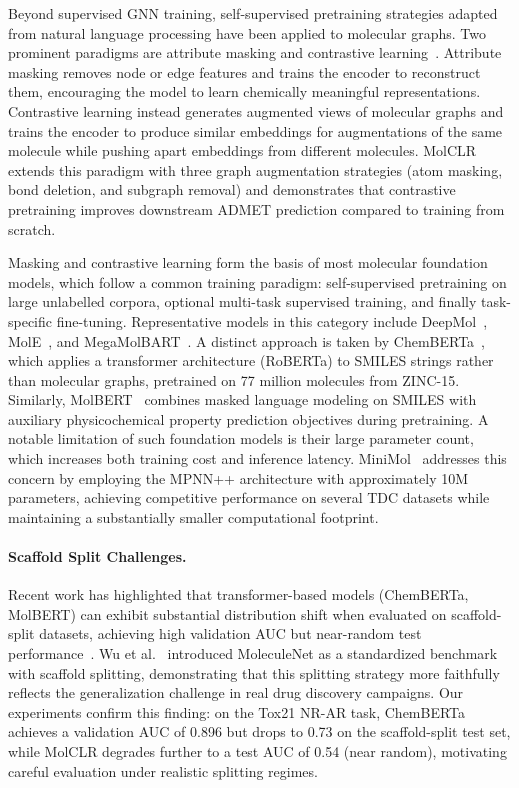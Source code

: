 \documentclass[12pt]{article}
\begin{document}
Beyond supervised GNN training, self-supervised pretraining strategies adapted from natural language processing have been applied to molecular graphs. Two prominent paradigms are attribute masking and contrastive learning~\cite{attrMasking, contrativeLearning}. Attribute masking removes node or edge features and trains the encoder to reconstruct them, encouraging the model to learn chemically meaningful representations. Contrastive learning instead generates augmented views of molecular graphs and trains the encoder to produce similar embeddings for augmentations of the same molecule while pushing apart embeddings from different molecules. MolCLR~\cite{molclr} extends this paradigm with three graph augmentation strategies (atom masking, bond deletion, and subgraph removal) and demonstrates that contrastive pretraining improves downstream ADMET prediction compared to training from scratch.

Masking and contrastive learning form the basis of most molecular foundation models, which follow a common training paradigm: self-supervised pretraining on large unlabelled corpora, optional multi-task supervised training, and finally task-specific fine-tuning. Representative models in this category include DeepMol~\cite{deepMol}, MolE~\cite{molE}, and MegaMolBART~\cite{mmelon}. A distinct approach is taken by ChemBERTa~\cite{chemberta2}, which applies a transformer architecture (RoBERTa) to SMILES strings rather than molecular graphs, pretrained on 77 million molecules from ZINC-15. Similarly, MolBERT~\cite{molbert} combines masked language modeling on SMILES with auxiliary physicochemical property prediction objectives during pretraining. A notable limitation of such foundation models is their large parameter count, which increases both training cost and inference latency. MiniMol~\cite{miniMol} addresses this concern by employing the MPNN++ architecture with approximately 10M parameters, achieving competitive performance on several TDC datasets while maintaining a substantially smaller computational footprint.

\paragraph{Scaffold Split Challenges.}
Recent work has highlighted that transformer-based models (ChemBERTa, MolBERT) can exhibit substantial distribution shift when evaluated on scaffold-split datasets, achieving high validation AUC but near-random test performance~\cite{yang2019dmpnn,chemberta2}. Wu et al.~\cite{wu2018moleculenet} introduced MoleculeNet as a standardized benchmark with scaffold splitting, demonstrating that this splitting strategy more faithfully reflects the generalization challenge in real drug discovery campaigns. Our experiments confirm this finding: on the Tox21 NR-AR task, ChemBERTa achieves a validation AUC of 0.896 but drops to 0.73 on the scaffold-split test set, while MolCLR degrades further to a test AUC of 0.54 (near random), motivating careful evaluation under realistic splitting regimes.
\end{document}

